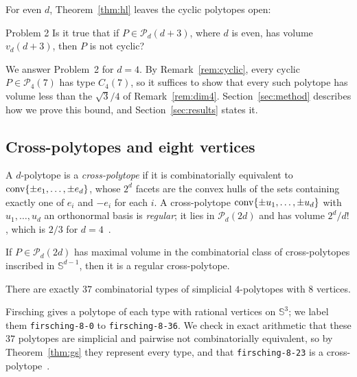 For even $d$, Theorem~\ref{thm:hl} leaves the cyclic polytopes open:

\begin{cited}{Problem 2}{{\cite[Section~5]{horvath-langi-2016}}}
  Is it true that if $P \in \mathcal{P}_{d}(d+3)$, where $d$ is even, has
  volume $v_{d}(d+3)$, then $P$ is not cyclic?
\end{cited}

We answer Problem~2 for $d = 4$. By Remark~\ref{rem:cyclic}, every cyclic
$P \in \mathcal{P}_{4}(7)$ has type $C_{4}(7)$, so it suffices to show that
every such polytope has volume less than the $\sqrt{3}/4$ of
Remark~\ref{rem:dim4}. Section~\ref{sec:method} describes how we prove this
bound, and Section~\ref{sec:results} states it.

\subsection{Cross-polytopes and eight vertices}

\begin{definition}
  \label{def:cross}
  A $d$-polytope is a \emph{cross-polytope} if it is combinatorially
  equivalent to $\operatorname{conv}\{\pm e_{1}, \ldots, \pm e_{d}\}$, whose $2^{d}$ facets
  are the convex hulls of the sets containing exactly one of $e_{i}$ and
  $-e_{i}$ for each $i$. A
  cross-polytope $\operatorname{conv}\{\pm u_{1}, \ldots, \pm u_{d}\}$ with $u_{1}, \ldots,
  u_{d}$ an orthonormal basis is \emph{regular}; it lies in
  $\mathcal{P}_{d}(2d)$ and has volume $2^{d}/d!$, which is $2/3$ for
  $d = 4$~.
\end{definition}

\begin{theorem}
  \label{thm:cross}
  If $P \in \mathcal{P}_{d}(2d)$ has maximal volume in the combinatorial class
  of cross-polytopes inscribed in $\mathbb{S}^{d-1}$, then it is a regular
  cross-polytope.
\end{theorem}

\begin{theorem}
  \label{thm:gs}
  There are exactly $37$ combinatorial types of simplicial $4$-polytopes with
  $8$ vertices.
\end{theorem}

\begin{remark}
  \label{rem:eighttypes}
  Firsching \cite{firsching-2017} gives a polytope of each type with rational
  vertices on $\mathbb{S}^{3}$; we label them \texttt{firsching-8-0} to
  \texttt{firsching-8-36}. We check in exact arithmetic that these $37$
  polytopes are simplicial and pairwise not combinatorially equivalent, so by
  Theorem~\ref{thm:gs} they represent every type, and that
  \texttt{firsching-8-23} is a cross-polytope~.
\end{remark}

